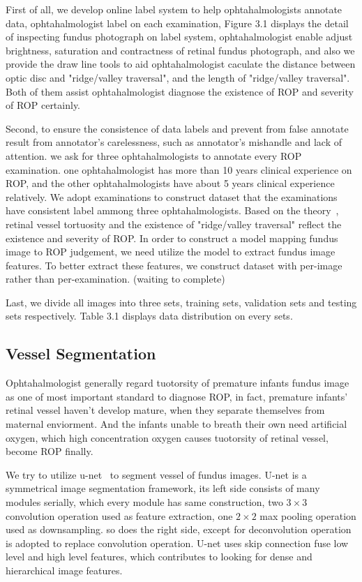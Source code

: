 \documentclass[10pt,twocolumn,letterpaper]{article}
\begin{document}
  First of all, we develop online label system to help ophtahalmologists annotate data, ophtahalmologist label on each examination, Figure 3.1 displays the detail of inspecting fundus photograph on label system, ophtahalmologist enable adjust brightness, saturation and contractness of retinal fundus photograph, and also we provide the draw line tools to aid ophtahalmologist caculate the distance between optic disc and "ridge/valley traversal", and the length of "ridge/valley traversal". Both of them assist ophtahalmologist diagnose the existence of ROP and severity of ROP certainly.

  Second, to ensure the consistence of data labels and prevent from false annotate result from annotator's carelessness, such as annotator's mishandle and lack of attention. we ask for three ophtahalmologists to annotate every ROP examination. one ophtahalmologist has more than 10 years clinical experience on ROP, and the other ophtahalmologists have about 5 years clinical experience relatively. We adopt examinations to construct dataset that the examinations have consistent label ammong three ophtahalmologists. Based on the theory~\cite{Alpher01}, retinal vessel tortuosity and the existence of "ridge/valley traversal" reflect the existence and severity of ROP. In order to construct a model mapping fundus image to ROP judgement, we need utilize the model to extract fundus image features. To better extract these features, we construct dataset with per-image rather than per-examination. (waiting to complete)

  Last, we divide all images into three sets, training sets, validation sets and testing sets respectively. Table 3.1 displays data distribution on every sets.

\subsection{Vessel Segmentation}
  Ophtahalmologist generally regard tuotorsity of premature infants fundus image as one of most important standard to diagnose ROP, in fact, premature infants' retinal vessel haven't develop mature, when they separate themselves from maternal enviorment. And the infants unable to breath their own need artificial oxygen, which high concentration oxygen causes tuotorsity of retinal vessel, become ROP finally.

  We try to utilize u-net~\cite{02} to segment vessel of fundus images. U-net is a symmetrical image segmentation framework, its left side consists of many modules serially, which every module has same construction, two $3\times3$ convolution operation used as feature extraction, one $2\times2$ max pooling operation used as downsampling. so does the right side, except for deconvolution operation is adopted to replace convolution operation. U-net uses skip connection fuse low level and high level features, which contributes to looking for dense and hierarchical image features.
\end{document}
